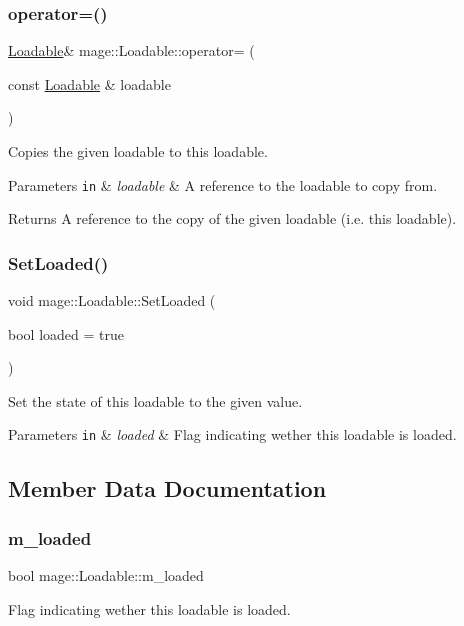 \subsubsection{\texorpdfstring{operator=()}{operator=()}}
{\footnotesize\ttfamily \hyperlink{classmage_1_1_loadable}{Loadable}\& mage\+::\+Loadable\+::operator= (\begin{DoxyParamCaption}\item[{const \hyperlink{classmage_1_1_loadable}{Loadable} \&}]{loadable }\end{DoxyParamCaption})\hspace{0.3cm}{\ttfamily [protected]}}

Copies the given loadable to this loadable.


\begin{DoxyParams}[1]{Parameters}
\mbox{\tt in}  & {\em loadable} & A reference to the loadable to copy from. \\
\hline
\end{DoxyParams}
\begin{DoxyReturn}{Returns}
A reference to the copy of the given loadable (i.\+e. this loadable). 
\end{DoxyReturn}
\hypertarget{classmage_1_1_loadable_a932ff8b287c8e68e30a13804cba08ff2}{}\label{classmage_1_1_loadable_a932ff8b287c8e68e30a13804cba08ff2} 
\subsubsection{\texorpdfstring{Set\+Loaded()}{SetLoaded()}}
{\footnotesize\ttfamily void mage\+::\+Loadable\+::\+Set\+Loaded (\begin{DoxyParamCaption}\item[{bool}]{loaded = {\ttfamily true} }\end{DoxyParamCaption})\hspace{0.3cm}{\ttfamily [protected]}}

Set the state of this loadable to the given value.


\begin{DoxyParams}[1]{Parameters}
\mbox{\tt in}  & {\em loaded} & Flag indicating wether this loadable is loaded. \\
\hline
\end{DoxyParams}


\subsection{Member Data Documentation}
\hypertarget{classmage_1_1_loadable_a993963fbfeb0f2e2ab9616bf7ef6a0f7}{}\label{classmage_1_1_loadable_a993963fbfeb0f2e2ab9616bf7ef6a0f7} 
\subsubsection{\texorpdfstring{m\+\_\+loaded}{m\_loaded}}
{\footnotesize\ttfamily bool mage\+::\+Loadable\+::m\+\_\+loaded\hspace{0.3cm}{\ttfamily [private]}}

Flag indicating wether this loadable is loaded. 